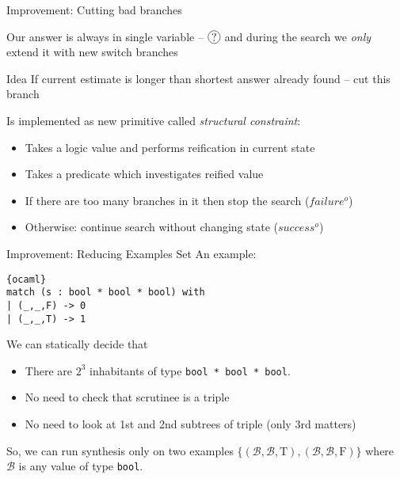 \documentclass[aspectratio=169
  , xcolor={svgnames}
  , hyperref={ colorlinks,citecolor=Blue
             , linkcolor=DarkRed,urlcolor=DarkBlue}
  , russian
  ]{beamer}
\newcommand*\circled[1]{\tikz[baseline=(char.base)]{
    \node[shape=circle,draw,inner sep=1pt] (char) {#1};}}
\begin{document}
\begin{frame}{Improvement: Cutting bad branches}

Our answer is always in single variable -- $\circled{?}$ and during the search we \emph{only} extend it with new switch branches\\

\begin{alertblock}{Idea}
If current estimate is longer than shortest answer already found -- cut this branch
\end{alertblock}

Is implemented as new primitive called \emph{structural constraint}:
\begin{itemize}
\item Takes a logic value and performs reification in current state
\item Takes a predicate which investigates reified value 
\item If there are too many branches in it then stop the search ($failure^o$)
\item Otherwise: continue search without changing state ($success^o$)
\end{itemize}

\end{frame}


\begin{frame}[fragile]{Improvement: Reducing Examples Set}
An example:
\begin{lstlisting}{ocaml}
match (s : bool * bool * bool) with 
| (_,_,F) -> 0
| (_,_,T) -> 1
\end{lstlisting}
\vspace{.5cm}
We can statically decide that 

\begin{itemize}
\item There are $2^3$ inhabitants of type \lstinline=bool * bool * bool=.
\item No need to  check that scrutinee is a triple
\item No need to look at 1st and 2nd subtrees of triple (only 3rd matters)
\end{itemize}
\vspace{.5cm}

So, we can run synthesis only on two examples $\{(\mathcal{B},\mathcal{B},\text{T}),(\mathcal{B},\mathcal{B},\text{F})\}$
where $\mathcal{B}$ is any value of type \lstinline=bool=.
\end{frame}


\end{document}
